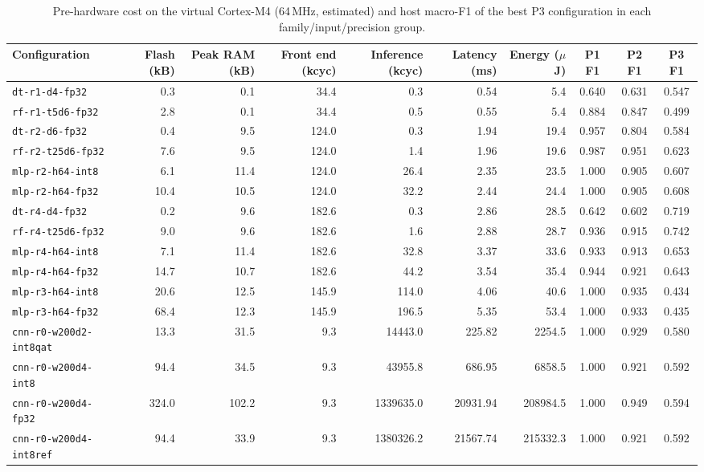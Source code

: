 \begin{table}[t]
\centering
\caption{Pre-hardware cost on the virtual Cortex-M4 (64\,MHz, estimated) and host macro-F1 of the best P3 configuration in each family/input/precision group.}
\label{tab:costs}
\setlength{\tabcolsep}{3.5pt}
\begin{tabular}{lrrrrrrccc}
\toprule
Configuration & Flash (kB) & Peak RAM (kB) & Front end (kcyc) & Inference (kcyc) & Latency (ms) & Energy ($\mu$J) & P1 F1 & P2 F1 & P3 F1\\
\midrule
\texttt{dt-r1-d4-fp32} & 0.3 & 0.1 & 34.4 & 0.3 & 0.54 & 5.4 & 0.640 & 0.631 & 0.547\\
\texttt{rf-r1-t5d6-fp32} & 2.8 & 0.1 & 34.4 & 0.5 & 0.55 & 5.4 & 0.884 & 0.847 & 0.499\\
\texttt{dt-r2-d6-fp32} & 0.4 & 9.5 & 124.0 & 0.3 & 1.94 & 19.4 & 0.957 & 0.804 & 0.584\\
\texttt{rf-r2-t25d6-fp32} & 7.6 & 9.5 & 124.0 & 1.4 & 1.96 & 19.6 & 0.987 & 0.951 & 0.623\\
\texttt{mlp-r2-h64-int8} & 6.1 & 11.4 & 124.0 & 26.4 & 2.35 & 23.5 & 1.000 & 0.905 & 0.607\\
\texttt{mlp-r2-h64-fp32} & 10.4 & 10.5 & 124.0 & 32.2 & 2.44 & 24.4 & 1.000 & 0.905 & 0.608\\
\texttt{dt-r4-d4-fp32} & 0.2 & 9.6 & 182.6 & 0.3 & 2.86 & 28.5 & 0.642 & 0.602 & 0.719\\
\texttt{rf-r4-t25d6-fp32} & 9.0 & 9.6 & 182.6 & 1.6 & 2.88 & 28.7 & 0.936 & 0.915 & 0.742\\
\texttt{mlp-r4-h64-int8} & 7.1 & 11.4 & 182.6 & 32.8 & 3.37 & 33.6 & 0.933 & 0.913 & 0.653\\
\texttt{mlp-r4-h64-fp32} & 14.7 & 10.7 & 182.6 & 44.2 & 3.54 & 35.4 & 0.944 & 0.921 & 0.643\\
\texttt{mlp-r3-h64-int8} & 20.6 & 12.5 & 145.9 & 114.0 & 4.06 & 40.6 & 1.000 & 0.935 & 0.434\\
\texttt{mlp-r3-h64-fp32} & 68.4 & 12.3 & 145.9 & 196.5 & 5.35 & 53.4 & 1.000 & 0.933 & 0.435\\
\texttt{cnn-r0-w200d2-int8qat} & 13.3 & 31.5 & 9.3 & 14443.0 & 225.82 & 2254.5 & 1.000 & 0.929 & 0.580\\
\texttt{cnn-r0-w200d4-int8} & 94.4 & 34.5 & 9.3 & 43955.8 & 686.95 & 6858.5 & 1.000 & 0.921 & 0.592\\
\texttt{cnn-r0-w200d4-fp32} & 324.0 & 102.2 & 9.3 & 1339635.0 & 20931.94 & 208984.5 & 1.000 & 0.949 & 0.594\\
\texttt{cnn-r0-w200d4-int8ref} & 94.4 & 33.9 & 9.3 & 1380326.2 & 21567.74 & 215332.3 & 1.000 & 0.921 & 0.592\\
\bottomrule
\end{tabular}
\end{table}
